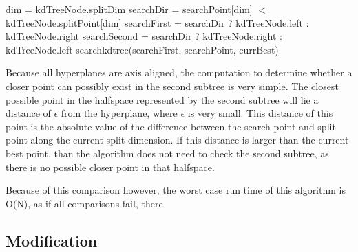 \begin{algorithmic}
\label{alg:searchkd}
	\State dim = kdTreeNode.splitDim
	\State searchDir = searchPoint[dim] $<$ kdTreeNode.splitPoint[dim]
	\State searchFirst = searchDir ? kdTreeNode.left : kdTreeNode.right
	\State searchSecond = searchDir ? kdTreeNode.right : kdTreeNode.left
	\State searchkdtree(searchFirst, searchPoint, currBest)
	\State

\EndFunction
\end{algorithmic}

Because all hyperplanes are axis aligned, the computation to determine whether a closer point can possibly exist in the second subtree is very simple.  The closest possible point in the halfspace represented by the second subtree will lie a distance of $\epsilon$ from the hyperplane, where $\epsilon$ is very small.  This distance of this point is the absolute value of the difference between the search point and split point along the current split dimension.  If this distance is larger than the current best point, than the algorithm does not need to check the second subtree, as there is no possible closer point in that halfspace.

Because of this comparison however, the worst case run time of this algorithm is O(N), as if all comparisons fail, there

\subsection{Modification}

